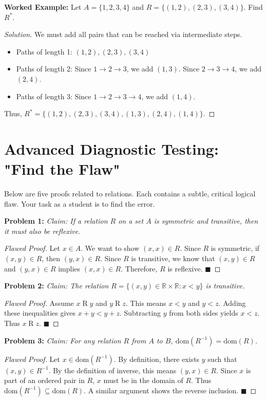 \documentclass[11pt, a4paper]{article}
\theoremstyle{definition}
\theoremstyle{remark}
\newcommand{\R}{\mathbb{R}}
\newcommand{\dom}{\text{dom}}
\begin{document}
\textbf{Worked Example:} Let $A = \{1, 2, 3, 4\}$ and $R = \{(1, 2), (2, 3), (3, 4)\}$. Find $R^*$.
\begin{proof}[Solution]
We must add all pairs that can be reached via intermediate steps.
\begin{itemize}
    \item Paths of length 1: $(1, 2), (2, 3), (3, 4)$
    \item Paths of length 2: Since $1 \to 2 \to 3$, we add $(1, 3)$. Since $2 \to 3 \to 4$, we add $(2, 4)$.
    \item Paths of length 3: Since $1 \to 2 \to 3 \to 4$, we add $(1, 4)$.
\end{itemize}
Thus, $R^* = \{(1, 2), (2, 3), (3, 4), (1, 3), (2, 4), (1, 4)\}$.
\end{proof}

\section{Advanced Diagnostic Testing: "Find the Flaw"}

Below are five proofs related to relations. Each contains a subtle, critical logical flaw. Your task as a student is to find the error.

\textbf{Problem 1:} \textit{Claim: If a relation $R$ on a set $A$ is symmetric and transitive, then it must also be reflexive.}
\begin{proof}[Flawed Proof]
Let $x \in A$. We want to show $(x, x) \in R$. Since $R$ is symmetric, if $(x, y) \in R$, then $(y, x) \in R$. Since $R$ is transitive, we know that $(x, y) \in R$ and $(y, x) \in R$ implies $(x, x) \in R$. Therefore, $R$ is reflexive. $\blacksquare$
\end{proof}

\textbf{Problem 2:} \textit{Claim: The relation $R = \{(x, y) \in \R \times \R : x < y\}$ is transitive.}
\begin{proof}[Flawed Proof]
Assume $x \mathrel{R} y$ and $y \mathrel{R} z$. This means $x < y$ and $y < z$. Adding these inequalities gives $x + y < y + z$. Subtracting $y$ from both sides yields $x < z$. Thus $x \mathrel{R} z$. $\blacksquare$
\end{proof}

\textbf{Problem 3:} \textit{Claim: For any relation $R$ from $A$ to $B$, $\dom(R^{-1}) = \dom(R)$.}
\begin{proof}[Flawed Proof]
Let $x \in \dom(R^{-1})$. By definition, there exists $y$ such that $(x, y) \in R^{-1}$. By the definition of inverse, this means $(y, x) \in R$. Since $x$ is part of an ordered pair in $R$, $x$ must be in the domain of $R$. Thus $\dom(R^{-1}) \subseteq \dom(R)$. A similar argument shows the reverse inclusion. $\blacksquare$
\end{proof}
\end{document}
